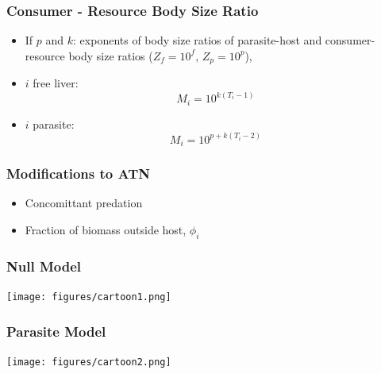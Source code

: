 \documentclass[table]{beamer}
\begin{document}
\begin{frame}
\frametitle{Consumer - Resource Body Size Ratio}
\begin{itemize}[<+->]
\item If $p$ and $k$: exponents of body size ratios of parasite-host and
    consumer-resource body size ratios ($Z_f = 10^f$, $Z_p = 10^p$),
\item $i$ free liver:
\[
M_i = 10^{k(T_i-1)}
\]
\item $i$ parasite:
\[
M_i = 10^{p + k(T_i-2)}
\]
\end{itemize}
\end{frame}

\begin{frame}
    \frametitle{Modifications to ATN}
  
    \begin{minipage}{0.45\textwidth} 
        \begin{itemize}
            \item<2-> Concomittant predation
            \item<3-> Fraction of biomass outside host, $\phi_i$
        \end{itemize}
    \end{minipage}
    \begin{minipage}{0.45\textwidth}
        \centering
    \end{minipage}
\end{frame}

\begin{frame}
    \frametitle{Null Model}
    \texttt{[image: figures/cartoon1.png]}
\end{frame}

\begin{frame}
    \frametitle{Parasite Model}
    \texttt{[image: figures/cartoon2.png]}
\end{frame}
\end{document}
